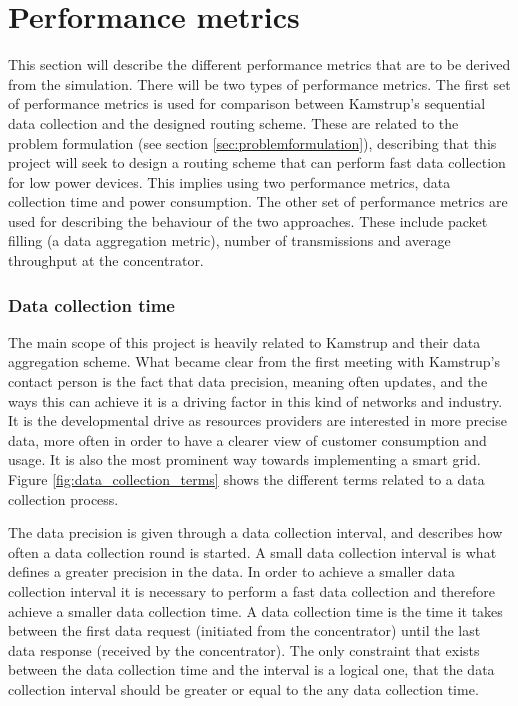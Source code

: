 \section{Performance metrics}
\label{sec:performance_metrics}

This section will describe the different performance metrics that are to be derived from the simulation. There will be two types of performance metrics. The first set of performance metrics is used for comparison between Kamstrup's sequential data collection and the designed routing scheme. These are related to the problem formulation (see section 
\ref{sec:problemformulation}), describing that this project will seek to design a routing scheme that can perform fast data collection for low power devices. This implies using two performance metrics, data collection time and power consumption. The other set of performance metrics are used for describing the behaviour of the two approaches. These include packet filling (a data aggregation metric), number of transmissions and average throughput at the concentrator.

\subsubsection{Data collection time}

The main scope of this project is heavily related to Kamstrup and their data aggregation scheme. What became clear from the first meeting with Kamstrup's contact person is the fact that data precision, meaning often updates, and the ways this can achieve it is a driving factor in this kind of networks and industry. It is the developmental drive as resources providers are interested in more precise data, more often in order to have a clearer view of customer consumption and usage. It is also the most prominent way towards implementing a smart grid. Figure \ref{fig:data_collection_terms} shows the different terms related to a data collection process.


The data precision is given through a data collection interval, and describes how often a data collection round is started. A small data collection interval is what defines a greater precision in the data. In order to achieve a smaller data collection interval it is necessary to perform a fast data collection and therefore achieve a smaller data collection time. A data collection time is the time it takes between the first data request (initiated from the concentrator) until the last data response (received by the concentrator). The only constraint that exists between the data collection time and the interval is a logical one, that the data collection interval should be greater or equal to the any data collection time. 

